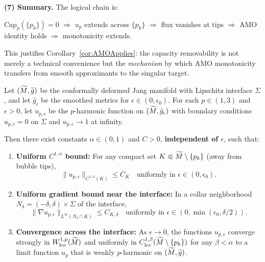 \begin{remark}
\textbf{(7) Summary.} The logical chain is:
\begin{center}
$\mathrm{Cap}_p(\{p_k\}) = 0$ $\Rightarrow$ $u_p$ extends across $\{p_k\}$ $\Rightarrow$ flux vanishes at tips $\Rightarrow$ AMO identity holds $\Rightarrow$ monotonicity extends.
\end{center}
This justifies Corollary~\ref{cor:AMOApplies}: the capacity removability is not merely a technical convenience but the \emph{mechanism} by which AMO monotonicity transfers from smooth approximants to the singular target.
\end{remark}

\begin{theorem}\label{thm:UniformPHarmonicRegularity}
Let $(\widetilde{M}, \widetilde{g})$ be the conformally deformed Jang manifold with Lipschitz interface $\Sigma$, and let $\hat{g}_\epsilon$ be the smoothed metrics for $\epsilon \in (0, \epsilon_0)$. For each $p \in (1,3)$ and $\epsilon > 0$, let $u_{p,\epsilon}$ be the $p$-harmonic function on $(\widetilde{M}, \hat{g}_\epsilon)$ with boundary conditions $u_{p,\epsilon} = 0$ on $\Sigma$ and $u_{p,\epsilon} \to 1$ at infinity.

Then there exist constants $\alpha \in (0,1)$ and $C > 0$, \textbf{independent of $\epsilon$}, such that:
\begin{enumerate}
    \item \textbf{Uniform $C^{1,\alpha}$ bound:} For any compact set $K \Subset \widetilde{M} \setminus \{p_k\}$ (away from bubble tips),
    \begin{equation}\label{eq:UniformC1alpha}
        \|u_{p,\epsilon}\|_{C^{1,\alpha}(K)} \le C_K \quad \text{uniformly in } \epsilon \in (0, \epsilon_0).
    \end{equation}
    
    \item \textbf{Uniform gradient bound near the interface:} In a collar neighborhood $N_\delta = (-\delta, \delta) \times \Sigma$ of the interface,
    \begin{equation}\label{eq:UniformGradientNearInterface}
        \|\nabla u_{p,\epsilon}\|_{L^\infty(N_\delta \cap K)} \le C_{K,\delta} \quad \text{uniformly in } \epsilon \in (0, \min(\epsilon_0, \delta/2)).
    \end{equation}
    
    \item \textbf{Convergence across the interface:} As $\epsilon \to 0$, the functions $u_{p,\epsilon}$ converge strongly in $W^{1,p}_{\mathrm{loc}}(\widetilde{M})$ and uniformly in $C^{1,\beta}_{\mathrm{loc}}(\widetilde{M} \setminus \{p_k\})$ for any $\beta < \alpha$ to a limit function $u_p$ that is weakly $p$-harmonic on $(\widetilde{M}, \widetilde{g})$.
    

\end{enumerate}
\end{theorem}
